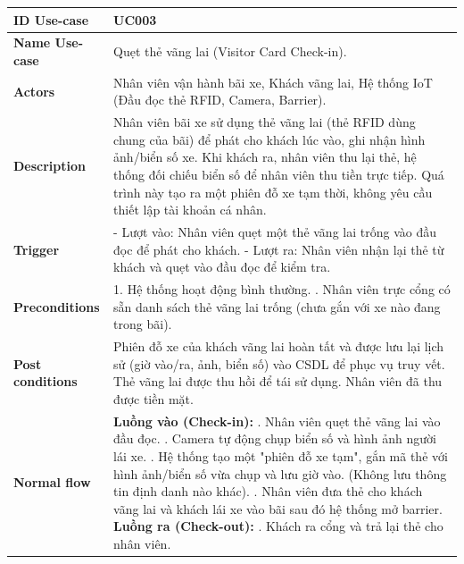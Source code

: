 \begin{center}
    \begin{longtable}{|>{\raggedright\arraybackslash}m{3.5cm}|m{12cm}|}
\hline
    \textbf{ID Use-case}  & UC003 \\ 
\hline
    \textbf{Name Use-case} & Quẹt thẻ vãng lai (Visitor Card Check-in). \\ 
\hline
    \textbf{Actors} & Nhân viên vận hành bãi xe, Khách vãng lai, Hệ thống IoT (Đầu đọc thẻ RFID, Camera, Barrier). \\
\hline
    \textbf{Description} & Nhân viên bãi xe sử dụng thẻ vãng lai (thẻ RFID dùng chung của bãi) để phát cho khách lúc vào, ghi nhận hình ảnh/biển số xe. Khi khách ra, nhân viên thu lại thẻ, hệ thống đối chiếu biển số để nhân viên thu tiền trực tiếp. Quá trình này tạo ra một phiên đỗ xe tạm thời, không yêu cầu thiết lập tài khoản cá nhân. \\
\hline
    \textbf{Trigger} & 
    - Lượt vào: Nhân viên quẹt một thẻ vãng lai trống vào đầu đọc để phát cho khách. \newline
    - Lượt ra: Nhân viên nhận lại thẻ từ khách và quẹt vào đầu đọc để kiểm tra. \\
\hline
    \textbf{Preconditions} & 
    1. Hệ thống hoạt động bình thường. \newline
    2. Nhân viên trực cổng có sẵn danh sách thẻ vãng lai trống (chưa gắn với xe nào đang trong bãi). \\
\hline
    \textbf{Post conditions} & Phiên đỗ xe của khách vãng lai hoàn tất và được lưu lại lịch sử (giờ vào/ra, ảnh, biển số) vào CSDL để phục vụ truy vết. Thẻ vãng lai được thu hồi để tái sử dụng. Nhân viên đã thu được tiền mặt. \\
\hline
    \textbf{Normal flow} & 
    \textbf{Luồng vào (Check-in):} \newline
    1. Nhân viên quẹt thẻ vãng lai vào đầu đọc. \newline
    2. Camera tự động chụp biển số và hình ảnh người lái xe. \newline
    3. Hệ thống tạo một "phiên đỗ xe tạm", gắn mã thẻ với hình ảnh/biển số vừa chụp và lưu giờ vào. (Không lưu thông tin định danh nào khác). \newline
    4. Nhân viên đưa thẻ cho khách vãng lai và khách lái xe vào bãi sau đó hệ thống mở barrier. \newline
    \newline
    \textbf{Luồng ra (Check-out):} \newline
    5. Khách ra cổng và trả lại thẻ cho nhân viên. \newline

\end{longtable}
\end{center}
